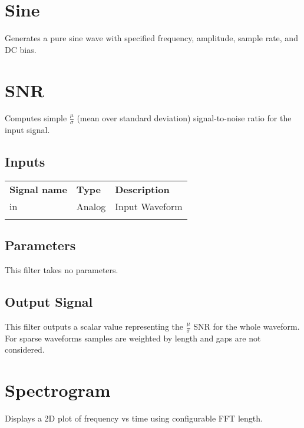 \section{Sine}

Generates a pure sine wave with specified frequency, amplitude, sample rate, and DC bias.

\pagebreak
\section{SNR}
Computes simple $\frac{\mu}{\sigma}$ (mean over standard deviation) signal-to-noise ratio for the input signal.

\subsection{Inputs}

\begin{tabularx}{16cm}{llX}
\thickhline
\textbf{Signal name} & \textbf{Type} & \textbf{Description} \\
\thickhline
in & Analog & Input Waveform \\
\thickhline
\end{tabularx}

\subsection{Parameters}

This filter takes no parameters.

\subsection{Output Signal}

This filter outputs a scalar value representing the $\frac{\mu}{\sigma}$ SNR for the whole waveform. For sparse
waveforms samples are weighted by length and gaps are not considered.

\pagebreak
\section{Spectrogram}

Displays a 2D plot of frequency vs time using configurable FFT length.

